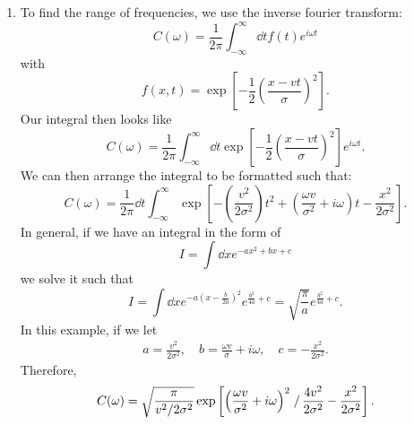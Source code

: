 \begin{sol}
\begin{enumerate}[label=\textbf{(\alph*)}]
\item To find the range of frequencies, we use the inverse fourier transform:
\[C (\omega) = \frac{1}{2\pi} \int_{-\infty}^{\infty} \dd t f(t) e^{i \omega t}\]
with 
\[f (x, t) = \exp \left[-\frac{1}{2}\left(\frac{x - vt}{\sigma}\right)^2\right].\]
Our integral then looks like 
\[C (\omega) = \frac{1}{2\pi} \int_{-\infty}^{\infty} \dd t \exp \left[-\frac{1}{2}\left(\frac{x - vt}{\sigma}\right)^2\right] e^{i \omega t}.\]
We can then arrange the integral to be formatted such that:
\[C (\omega) = \frac{1}{2\pi} \dd t\int_{-\infty}^{\infty} \exp \left[-\left(\frac{v^2}{2\sigma^2}\right)t^2 + \left(\frac{\omega v}{\sigma^2} + i\omega\right)t - \frac{x^2}{2\sigma^2}\right].\]
In general, if we have an integral in the form of 
\[I = \int \dd x e^{-ax^2 + bx + c}\]
we solve it such that 
\[I = \int \dd x e^{-a \left(x - \frac{b}{2a}\right)^2}e^{\frac{b^2}{4a} + c} = \sqrt{\frac{\pi}{a}} e^{\frac{b^2}{4a} + c}.\]
In this example, if we let 
\begin{align*}
    a = \frac{v^2}{2\sigma^2}, \quad b = \frac{\omega v}{\sigma} + i\omega, \quad c = -\frac{x^2}{2\sigma^2}.
\end{align*}
Therefore, 
\[ C (\omega) = \sqrt{\frac{\pi}{v^2/2\sigma^2}} \exp \left[\left(\frac{\omega v}{\sigma^2} + i\omega\right)^2\left.\right/ \frac{4v^2}{2\sigma^2} - \frac{x^2}{2\sigma^2} \right].\]
\end{enumerate}
\end{sol}